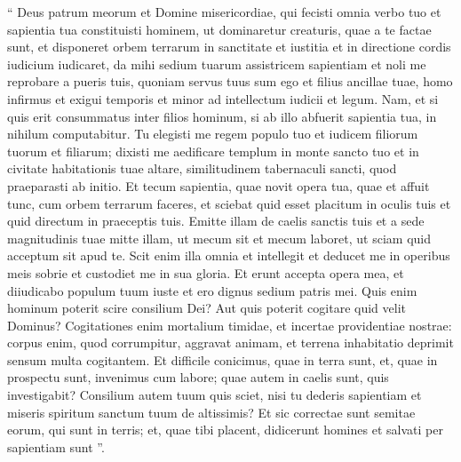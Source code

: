 \begin{biblechapter}
\begin{biblechapter}
\begin{biblechapter}
\begin{biblechapter}
\begin{biblechapter}
\begin{biblechapter}
\begin{biblechapter}
\begin{biblechapter}
\begin{biblechapter}
\verse “ Deus patrum meorum et Domine misericordiae,
 qui fecisti omnia verbo tuo
 \verse et sapientia tua constituisti hominem,
 ut dominaretur creaturis, quae a te factae sunt,
 \verse et disponeret orbem terrarum in sanctitate et iustitia
 et in directione cordis iudicium iudicaret,
 \verse da mihi sedium tuarum assistricem sapientiam
 et noli me reprobare a pueris tuis,
 \verse quoniam servus tuus sum ego et filius ancillae tuae,
 homo infirmus et exigui temporis
 et minor ad intellectum iudicii et legum.
 \verse Nam, et si quis erit consummatus inter filios hominum,
 si ab illo abfuerit sapientia tua, in nihilum computabitur.
 \verse Tu elegisti me regem populo tuo
 et iudicem filiorum tuorum et filiarum;
 \verse dixisti me aedificare templum in monte sancto tuo
 et in civitate habitationis tuae altare,
 similitudinem tabernaculi sancti,
 quod praeparasti ab initio.
 \verse Et tecum sapientia, quae novit opera tua,
 quae et affuit tunc, cum orbem terrarum faceres,
 et sciebat quid esset placitum in oculis tuis
 et quid directum in praeceptis tuis.
 \verse Emitte illam de caelis sanctis tuis
 et a sede magnitudinis tuae mitte illam,
 ut mecum sit et mecum laboret,
 ut sciam quid acceptum sit apud te.
 \verse Scit enim illa omnia et intellegit
 et deducet me in operibus meis sobrie
 et custodiet me in sua gloria.
 \verse Et erunt accepta opera mea,
 et diiudicabo populum tuum iuste
 et ero dignus sedium patris mei.
 \verse Quis enim hominum poterit scire consilium Dei?
 Aut quis poterit cogitare quid velit Dominus?
 \verse Cogitationes enim mortalium timidae,
 et incertae providentiae nostrae:
 \verse corpus enim, quod corrumpitur, aggravat animam,
 et terrena inhabitatio deprimit sensum multa cogitantem.
 \verse Et difficile conicimus, quae in terra sunt,
 et, quae in prospectu sunt, invenimus cum labore;
 quae autem in caelis sunt, quis investigabit?
 \verse Consilium autem tuum quis sciet,
 nisi tu dederis sapientiam
 et miseris spiritum sanctum tuum de altissimis?
 \verse Et sic correctae sunt semitae eorum, qui sunt in terris;
 et, quae tibi placent, didicerunt homines
 et salvati per sapientiam sunt ”.
 

\end{biblechapter}
\end{biblechapter}
\end{biblechapter}
\end{biblechapter}
\end{biblechapter}
\end{biblechapter}
\end{biblechapter}
\end{biblechapter}
\end{biblechapter}
